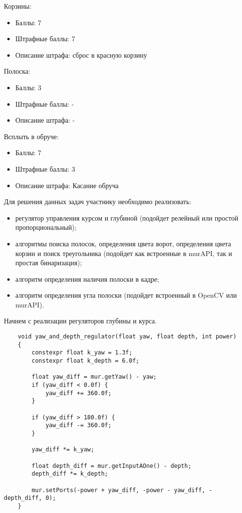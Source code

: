 Корзины:
\begin{itemize}
    \item Баллы: 7
    \item Штрафные баллы: 7
    \item Описание штрафа: сброс в красную корзину
\end{itemize}

Полоска:
\begin{itemize}
    \item Баллы: 3
    \item Штрафные баллы: -
    \item Описание штрафа: -
\end{itemize}

Всплыть в обруче:
\begin{itemize}
    \item Баллы: 7
    \item Штрафные баллы: 3
    \item Описание штрафа: Касание обруча
\end{itemize}

\solutionSection

Для решения данных задач участнику необходимо реализовать:

\begin{itemize}
    \item регулятор управления курсом и глубиной (подойдет релейный или простой пропорциональный);
    \item алгоритмы поиска полосок, определения цвета ворот, определения цвета корзин и поиск треугольника (подойдет как встроенные в murAPI, так и простая бинаризация);
    \item алгоритм определения наличия полоски в кадре;
    \item алгоритм определения угла полоски (подойдет встроенный в OpenCV или murAPI).
\end{itemize}

Начнем с реализации регуляторов глубины и курса.

\begin{verbatim}
    void yaw_and_depth_regulator(float yaw, float depth, int power)
    {
        constexpr float k_yaw = 1.3f;
        constexpr float k_depth = 6.0f;

        float yaw_diff = mur.getYaw() - yaw;
        if (yaw_diff < 0.0f) {
            yaw_diff += 360.0f;
        }

        if (yaw_diff > 180.0f) {
            yaw_diff -= 360.0f;
        }

        yaw_diff *= k_yaw;

        float depth_diff = mur.getInputAOne() - depth;
        depth_diff *= k_depth;

        mur.setPorts(-power + yaw_diff, -power - yaw_diff, -depth_diff, 0);
    }
\end{verbatim}

